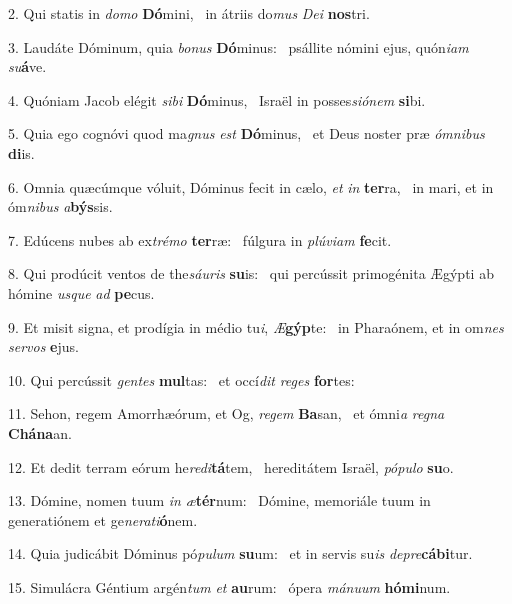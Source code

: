 2. Qui statis in \textit{do}\textit{mo} \textbf{Dó}mini, \ast\  in átriis do\textit{mus} \textit{De}\textit{i} \textbf{nos}tri.\

3. Laudáte Dóminum, quia \textit{bo}\textit{nus} \textbf{Dó}minus: \ast\  psállite nómini ejus, quón\textit{i}\textit{am} \textit{su}\textbf{á}ve.\

4. Quóniam Jacob elégit \textit{si}\textit{bi} \textbf{Dó}minus, \ast\  Israël in posses\textit{si}\textit{ó}\textit{nem} \textbf{si}bi.\

5. Quia ego cognóvi quod ma\textit{gnus} \textit{est} \textbf{Dó}minus, \ast\  et Deus noster præ \textit{óm}\textit{ni}\textit{bus} \textbf{di}is.\

6. Omnia quæcúmque vóluit, Dóminus fecit in cælo, \textit{et} \textit{in} \textbf{ter}ra, \ast\  in mari, et in óm\textit{ni}\textit{bus} \textit{a}\textbf{býs}sis.\

7. Edúcens nubes ab ex\textit{tré}\textit{mo} \textbf{ter}ræ: \ast\  fúlgura in \textit{plú}\textit{vi}\textit{am} \textbf{fe}cit.\

8. Qui prodúcit ventos de the\textit{sáu}\textit{ris} \textbf{su}is: \ast\  qui percússit primogénita Ægýpti ab hómine \textit{us}\textit{que} \textit{ad} \textbf{pe}cus.\

9. Et misit signa, et prodígia in médio tu\textit{i}, \textit{Æ}\textbf{gýp}te: \ast\  in Pharaónem, et in om\textit{nes} \textit{ser}\textit{vos} \textbf{e}jus.\

10. Qui percússit \textit{gen}\textit{tes} \textbf{mul}tas: \ast\  et occí\textit{dit} \textit{re}\textit{ges} \textbf{for}tes:\

11. Sehon, regem Amorrhæórum, et Og, \textit{re}\textit{gem} \textbf{Ba}san, \ast\  et ómni\textit{a} \textit{re}\textit{gna} \textbf{Chá}\textbf{na}an.\

12. Et dedit terram eórum he\textit{re}\textit{di}\textbf{tá}tem, \ast\  hereditátem Israël, \textit{pó}\textit{pu}\textit{lo} \textbf{su}o.\

13. Dómine, nomen tuum \textit{in} \textit{æ}\textbf{tér}num: \ast\  Dómine, memoriále tuum in generatiónem et ge\textit{ne}\textit{ra}\textit{ti}\textbf{ó}nem.\

14. Quia judicábit Dóminus pó\textit{pu}\textit{lum} \textbf{su}um: \ast\  et in servis su\textit{is} \textit{de}\textit{pre}\textbf{cá}\textbf{bi}tur.\

15. Simulácra Géntium argén\textit{tum} \textit{et} \textbf{au}rum: \ast\  ópera \textit{má}\textit{nu}\textit{um} \textbf{hó}\textbf{mi}num.\

